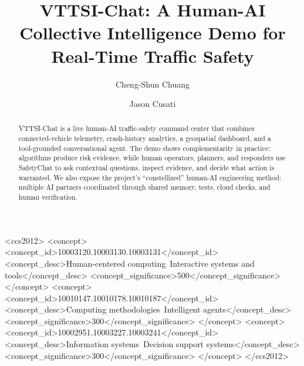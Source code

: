 \documentclass[manuscript,screen]{acmart}
\begin{document}
\title[VTTSI-Chat CI Demo]{VTTSI-Chat: A Human-AI Collective Intelligence Demo
for Real-Time Traffic Safety}

\author{Cheng-Shun Chuang}

\author{Jason Cusati}

\renewcommand{\shortauthors}{Chuang and Cusati}

\begin{abstract}
VTTSI-Chat is a live human-AI traffic-safety command center that combines
connected-vehicle telemetry, crash-history analytics, a geospatial dashboard,
and a tool-grounded conversational agent. The demo shows complementarity in
practice: algorithms produce risk evidence, while human operators, planners,
and responders use SafetyChat to ask contextual questions, inspect evidence,
and decide what action is warranted. We also expose the project's
``constellized'' human-AI engineering method: multiple AI partners coordinated
through shared memory, tests, cloud checks, and human verification.
\end{abstract}

\begin{CCSXML}
<ccs2012>
 <concept>
  <concept_id>10003120.10003130.10003131</concept_id>
  <concept_desc>Human-centered computing~Interactive systems and tools</concept_desc>
  <concept_significance>500</concept_significance>
 </concept>
 <concept>
  <concept_id>10010147.10010178.10010187</concept_id>
  <concept_desc>Computing methodologies~Intelligent agents</concept_desc>
  <concept_significance>300</concept_significance>
 </concept>
 <concept>
  <concept_id>10002951.10003227.10003241</concept_id>
  <concept_desc>Information systems~Decision support systems</concept_desc>
  <concept_significance>300</concept_significance>
 </concept>
</ccs2012>
\end{CCSXML}


\end{document}
